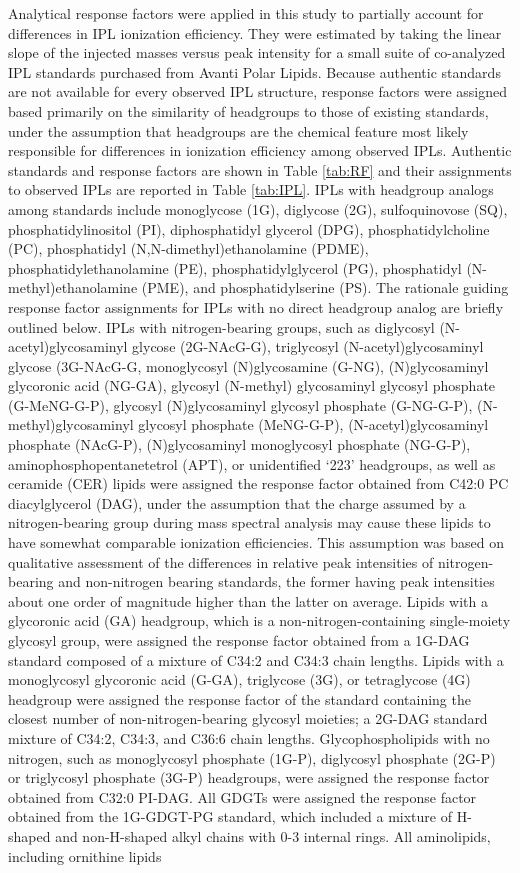 Analytical response factors were applied in this study to partially account for differences in IPL ionization efficiency. They were estimated by taking the linear slope of the injected masses versus peak intensity for a small suite of co-analyzed IPL standards purchased from Avanti Polar Lipids. Because authentic standards are not available for every observed IPL structure, response factors were assigned based primarily on the similarity of headgroups to those of existing standards, under the assumption that headgroups are the chemical feature most likely responsible for differences in ionization efficiency among observed IPLs. Authentic standards and response factors are shown in Table \ref{tab:RF} and their assignments to observed IPLs are reported in Table \ref{tab:IPL}. IPLs with headgroup analogs among standards include monoglycose (1G), diglycose (2G), sulfoquinovose (SQ), phosphatidylinositol (PI), diphosphatidyl glycerol (DPG), phosphatidylcholine (PC), phosphatidyl (N,N-dimethyl)ethanolamine (PDME), phosphatidylethanolamine (PE), phosphatidylglycerol (PG), phosphatidyl (N-methyl)ethanolamine (PME), and phosphatidylserine (PS). The rationale guiding response factor assignments for IPLs with no direct headgroup analog are briefly outlined below. IPLs with nitrogen-bearing groups, such as diglycosyl (N-acetyl)glycosaminyl glycose (2G-NAcG-G), triglycosyl (N-acetyl)glycosaminyl glycose (3G-NAcG-G, monoglycosyl (N)glycosamine (G-NG), (N)glycosaminyl glycoronic acid (NG-GA), glycosyl (N-methyl) glycosaminyl glycosyl phosphate (G-MeNG-G-P), glycosyl (N)glycosaminyl glycosyl phosphate (G-NG-G-P), (N-methyl)glycosaminyl glycosyl phosphate (MeNG-G-P), (N-acetyl)glycosaminyl phosphate (NAcG-P), (N)glycosaminyl monoglycosyl phosphate (NG-G-P), aminophosphopentanetetrol (APT), or unidentified `223' headgroups, as well as ceramide (CER) lipids were assigned the response factor obtained from C42:0 PC diacylglycerol (DAG), under the assumption that the charge assumed by a nitrogen-bearing group during mass spectral analysis may cause these lipids to have somewhat comparable ionization efficiencies. This assumption was based on qualitative assessment of the differences in relative peak intensities of nitrogen-bearing and non-nitrogen bearing standards, the former having peak intensities about one order of magnitude higher than the latter on average. Lipids with a glycoronic acid (GA) headgroup, which is a non-nitrogen-containing single-moiety glycosyl group, were assigned the response factor obtained from a 1G-DAG standard composed of a mixture of C34:2 and C34:3 chain lengths. Lipids with a monoglycosyl glycoronic acid (G-GA), triglycose (3G), or tetraglycose (4G) headgroup were assigned the response factor of the standard containing the closest number of non-nitrogen-bearing glycosyl moieties; a 2G-DAG standard mixture of C34:2, C34:3, and C36:6 chain lengths. Glycophospholipids with no nitrogen, such as monoglycosyl phosphate (1G-P), diglycosyl phosphate (2G-P) or triglycosyl phosphate (3G-P) headgroups, were assigned the response factor obtained from C32:0 PI-DAG. All GDGTs were assigned the response factor obtained from the 1G-GDGT-PG standard, which included a mixture of H-shaped and non-H-shaped alkyl chains with 0-3 internal rings. All aminolipids, including ornithine lipids 